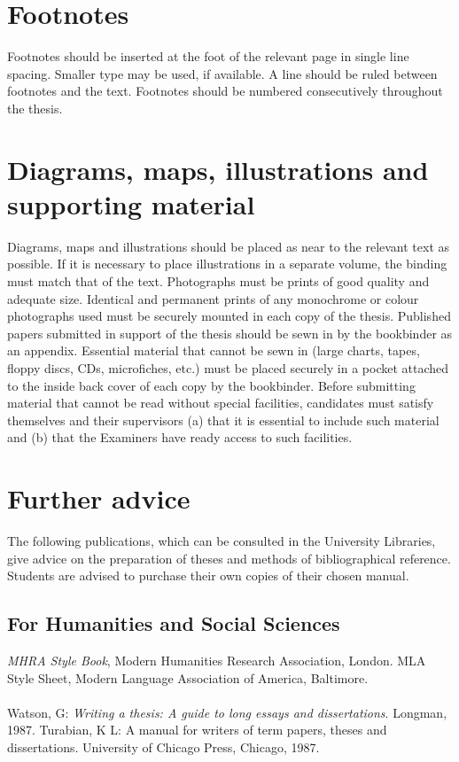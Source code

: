 \section{Footnotes}
Footnotes should be inserted at the foot of the relevant page in single line 
spacing. Smaller type may be used, if available. A line should be ruled 
between footnotes and the text. Footnotes should be numbered 
consecutively throughout the thesis.
\section{Diagrams, maps, illustrations and supporting material}
Diagrams, maps and illustrations should be placed as near to the relevant 
text as possible. If it is necessary to place illustrations in a separate volume, 
the binding must match that of the text. Photographs must be prints of good 
quality and adequate size. Identical and permanent prints of any 
monochrome or colour photographs used must be securely mounted in 
each copy of the thesis.
Published papers submitted in support of the thesis should be sewn in by 
the bookbinder as an appendix.
Essential material that cannot be sewn in (large charts, tapes, floppy discs, 
CDs, microfiches, etc.) must be placed securely in a pocket attached to the 
inside back cover of each copy by the bookbinder. Before submitting 
material that cannot be read without special facilities, candidates must 
satisfy themselves and their supervisors (a) that it is essential to include 
such material and (b) that the Examiners have ready access to such 
facilities. 

\section{Further advice}
The following publications, which can be consulted in the University 
Libraries, give advice on the preparation of theses and methods of 
bibliographical reference. Students are advised to purchase their own 
copies of their chosen manual. 

\subsection{For Humanities and Social Sciences}
\emph{MHRA Style Book}, Modern Humanities Research Association, London. 
MLA Style Sheet, Modern Language Association of America, 
Baltimore. 
\\
\\
Watson, G: \emph{Writing a thesis: A guide to long essays and dissertations}. 
Longman, 1987. 
Turabian, K L: A manual for writers of term papers, theses and 
dissertations. University of Chicago Press, Chicago, 1987. 

